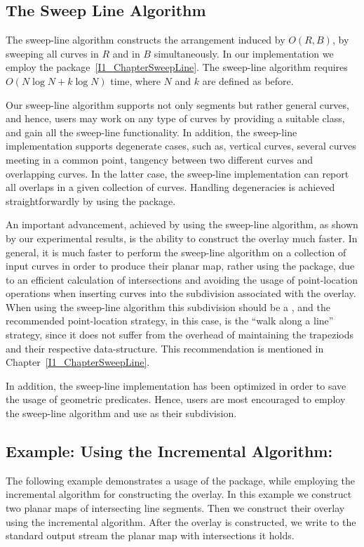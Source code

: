 \subsection*{The Sweep Line Algorithm}
\label{sec:MapOverlaySweepLine}
The sweep-line algorithm constructs the arrangement induced by $O(R,B)$, 
by sweeping all curves in $R$ and in $B$ simultaneously. 
In our implementation we employ the  
package~\ref{I1_ChapterSweepLine}. 
The sweep-line algorithm requires $O(N\log{N} + k\log{N})$ time,
where $N$ and $k$ are defined as before.

Our sweep-line algorithm supports not only segments but rather 
general curves, and hence, users may work on any type of curves by 
providing a suitable  class, and 
gain all the sweep-line functionality.
In addition, the sweep-line implementation supports degenerate cases, 
such as, vertical curves, several curves meeting in a common point, 
tangency between two different curves and overlapping curves.
In the latter case, the sweep-line implementation can report all overlaps
in a given collection of curves.
Handling degeneracies is achieved straightforwardly by using the 
 package.

An important advancement, achieved by using the sweep-line algorithm, 
as shown by our experimental results,
is the ability to construct the overlay much faster.
In general, it is much faster to perform the sweep-line algorithm on
a collection of input curves in order to produce their planar map,
rather using the  package,
due to an efficient calculation of intersections and avoiding the usage of
point-location operations when inserting curves into the subdivision 
associated with the overlay. When using the sweep-line algorithm this 
subdivision should be a , and the recommended 
point-location strategy, in this case, is the ``walk along a line'' 
strategy, since it does not suffer from the overhead of maintaining 
the trapeziods and their respective data-structure.
This recommendation is mentioned in Chapter~\ref{I1_ChapterSweepLine}.

In addition, the sweep-line implementation has been optimized in order to
save the usage of geometric predicates. 
Hence, users are most encouraged to employ the sweep-line algorithm 
and use  as their subdivision. 

\subsection*{Example: Using the Incremental Algorithm:}
The following example demonstrates a usage of the 
 package, 
while employing the incremental algorithm for constructing the overlay.
In this example we construct two planar maps of intersecting line segments. 
Then we construct their overlay using the incremental algorithm. 
After the overlay is constructed, we write to the standard output stream 
the planar map with intersections it holds. 

